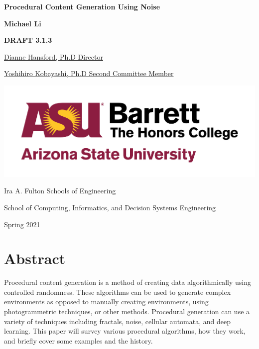 \documentclass[10pt]{report}
\begin{document}
	\begin{titlepage}
		\begin{center}
			\Large
			\textbf{Procedural Content Generation Using Noise}
			
			\vspace{1.5cm}
			\normalsize
			\textbf{Michael Li}
			
			\vfill
			
			\textbf{DRAFT 3.1.3}
			
			\uline{Dianne Hansford, Ph.D \hfill Director}
			\vspace{1cm}
			
			\uline{Yoshihiro Kobayashi, Ph.D \hfill Second Committee Member}
			
			\vspace{3cm}
			
			\includegraphics[scale=.5]{asu_barretthonors_horiz_rgb_maroongold_600ppi}
			
			\vspace{1.5cm}
			Ira A. Fulton Schools of Engineering
			
			School of Computing, Informatics, and Decision Systems Engineering
			
			Spring 2021
			
		\end{center}
	\end{titlepage}
	
	\chapter*{Abstract}
	
	Procedural content generation is a method of creating data algorithmically using controlled randomness. These algorithms can be used to generate complex environments as opposed to manually creating environments, using photogrammetric techniques, or other methods. Procedural generation can use a variety of techniques including fractals, noise, cellular automata, and deep learning. This paper will survey various procedural algorithms, how they work, and briefly cover some examples and the history.
	
\end{document}
